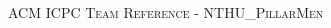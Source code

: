 \documentclass[a4paper,10pt,oneside]{article}
\begin{document}
  \begin{multicols}{3}
  \pagestyle{fancy}
  
  \fancyfoot{}
  \fancyhead[R]{\thepage}
  
  \renewcommand{\headrulewidth}{0.4pt}
  \renewcommand{\contentsname}{Contents}

   
  \scriptsize
  
  \clearpage
  \end{multicols}
  \newpage
  \begin{multicols}{3}
  \enlargethispage*{\baselineskip}
  \begin{center}
    \Huge\textsc{ACM ICPC Team Reference - NTHU\_PillarMen}
    \vspace{0.35cm}    
  \end{center}
  \tableofcontents
  \end{multicols}
  \clearpage
\end{document}
